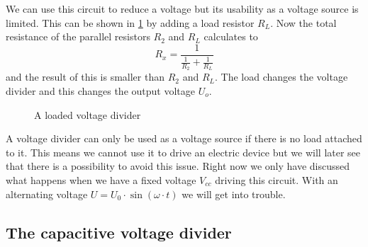 We can use this circuit to reduce a voltage but its usability as a voltage source is limited. This can be shown in \cref{fig:loaded-voltage-divider} by adding a load resistor $R_L$. Now the total resistance of the parallel resistors $R_2$ and $R_L$ calculates to
\begin{equation*}
	R_x = \frac{1}{\frac{1}{R_2} + \frac{1}{R_L}}
\end{equation*}
and the result of this is smaller than $R_2$ and $R_L$. The load changes the voltage divider and this changes the output voltage $U_o$.


\begin{figure}[htb]
	\centering
	\caption{A loaded voltage divider}
	\label{fig:loaded-voltage-divider}
\end{figure}

A voltage divider can only be used as a voltage source if there is no load attached to it. This means we cannot use it to drive an electric device but we will later see that there is a possibility to avoid this issue. Right now we only have discussed what happens when we have a fixed voltage $V_{cc}$ driving this circuit. With an alternating voltage $U = U_0 \cdot \sin(\omega \cdot t)$ we will get into trouble.

\subsection{The capacitive voltage divider}
